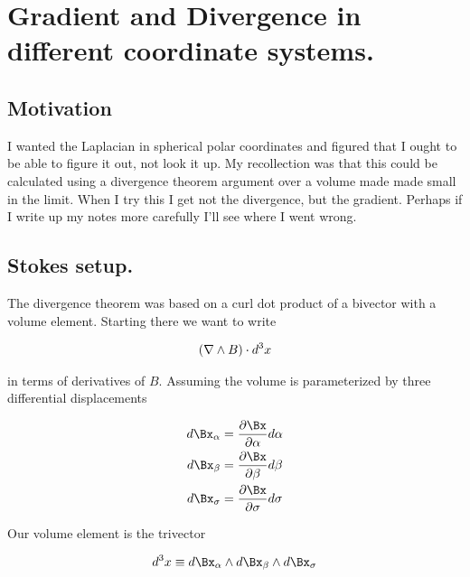 

\chapter{Gradient and Divergence in different coordinate systems.}
\label{chap:gradientAltCoord}
{}
\date{Aug 22, 2009}

\beginArtWithToc

\section{Motivation}

I wanted the Laplacian in spherical polar coordinates and figured that I ought to be able to figure it out, not look it up.  My recollection was that this could be calculated using a divergence theorem argument over a volume made made small in the limit.  When I try this I get not the divergence, but the gradient.  Perhaps if I write up my notes more carefully I'll see where I went wrong.

\section{Stokes setup.}

The  divergence theorem was based on a curl dot product of a bivector with a volume element.  Starting there we want to write

\begin{align}\label{eqn:curlDotVolumeDifferentialElement}
(\nabla \wedge B) \cdot d^3 x
\end{align}

in terms of derivatives of $B$.  Assuming the volume is parameterized by three differential displacements

\begin{align*}
d\Bx_\alpha &= \PD{\alpha}{\Bx} d\alpha \\
d\Bx_\beta &= \PD{\beta}{\Bx} d\beta \\
d\Bx_\sigma &= \PD{\sigma}{\Bx} d\sigma
\end{align*}

Our volume element is the trivector

\begin{align}\label{eqn:volumeElement}
d^3 x \equiv d\Bx_\alpha  \wedge d\Bx_\beta  \wedge d\Bx_\sigma
\end{align}

